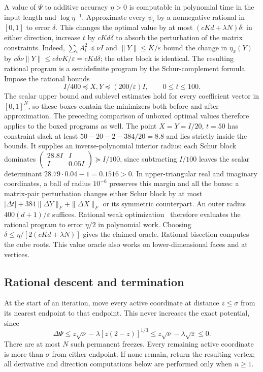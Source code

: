 A value of $\Psi$ to additive accuracy $\eta>0$ is computable in
polynomial time in the input length and $\log\eta^{-1}$.
Approximate every $\psi_i$ by a nonnegative rational in $[0,1]$ to
error $\delta$.  This changes the optimal value by at most
$(cKd+\lambda N)\delta$: in either direction, increase $t$ by
$cKd\delta$ to absorb the perturbation of the matrix constraints.
Indeed, $\sum_iA_i^2\preceq\nu I$ and
$\|Y\|\le K/\varepsilon$ bound the change in $\eta_x(Y)$ by
$c\delta\nu\|Y\|\le c\delta\nu K/\varepsilon=cKd\delta$;
the other block is identical.
The resulting rational program is a semidefinite program by the
Schur-complement formula.  Impose the rational bounds
\[
 I/400\preceq X,Y\preceq(200/\varepsilon)I,
 \qquad 0\le t\le100.
\]
The scalar upper bound and sublevel estimates hold for every coefficient
vector in $[0,1]^N$, so these boxes contain the minimizers both before
and after approximation. The preceding comparison of unboxed optimal
values therefore applies to the boxed programs as well.
The point $X=Y=I/20$, $t=50$ has
constraint slack at least $50-20-2-384/20=8.8$ and lies strictly
inside the bounds.  It supplies an inverse-polynomial interior
radius: each Schur block dominates
$\left(\begin{smallmatrix}28.8I&I\\I&0.05I\end{smallmatrix}\right)
\succeq I/100$, since subtracting $I/100$ leaves the scalar
determinant $28.79\cdot0.04-1=0.1516>0$.
In upper-triangular real and imaginary coordinates, a ball of radius
$10^{-6}$ preserves this margin and all the boxes: a matrix-pair
perturbation changes either Schur block by at most
$|\Delta t|+384\|\Delta Y\|_F+\|\Delta X\|_F$ or its symmetric
counterpart.  An outer radius $400(d+1)/\varepsilon$ suffices.
Rational weak optimization~\cite{GLS1988} therefore evaluates the
rational program to error $\eta/2$ in polynomial work.  Choosing
$\delta\le\eta/[2(cKd+\lambda N)]$ gives the claimed oracle.
Rational bisection computes the cube roots.  This value oracle also
works on lower-dimensional faces and at vertices.

\subsection{Rational descent and termination}

At the start of an iteration, move every active coordinate at distance
$z\le\sigma$ from its nearest endpoint to that endpoint.  This never
increases the exact potential, since
\[
 \Delta\Psi\le z\sqrt\nu-\lambda[z(2-z)]^{1/3}
             \le z\sqrt\nu-\lambda\sqrt z\le0.
\]
There are at most $N$ such permanent freezes.  Every remaining active
coordinate is more than $\sigma$ from either endpoint. If none remain,
return the resulting vertex; all derivative and direction computations
below are performed only when $n\ge1$.

